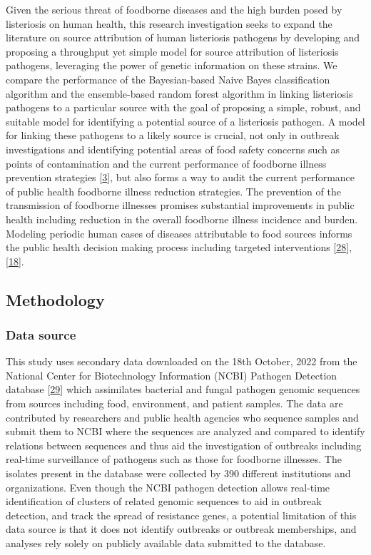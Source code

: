 \documentclass[
  10pt,
]{article}
\begin{document}
Given the serious threat of foodborne diseases and the high burden posed by listeriosis on human health, this research investigation seeks to expand the literature on source attribution of human listeriosis pathogens by developing and proposing a throughput yet simple model for source attribution of listeriosis pathogens, leveraging the power of genetic information on these strains. We compare the performance of the Bayesian-based Naive Bayes classification algorithm and the ensemble-based random forest algorithm in linking listeriosis pathogens to a particular source with the goal of proposing a simple, robust, and suitable model for identifying a potential source of a listeriosis pathogen. A model for linking these pathogens to a likely source is crucial, not only in outbreak investigations and identifying potential areas of food safety concerns such as points of contamination and the current performance of foodborne illness prevention strategies {[}\protect\hyperlink{ref-tanui2022machine}{3}{]}, but also forms a way to audit the current performance of public health foodborne illness reduction strategies. The prevention of the transmission of foodborne illnesses promises substantial improvements in public health including reduction in the overall foodborne illness incidence and burden. Modeling periodic human cases of diseases attributable to food sources informs the public health decision making process including targeted interventions {[}\protect\hyperlink{ref-pires2014source}{28}{]}, {[}\protect\hyperlink{ref-Munck2020}{18}{]}.

\hypertarget{methodology}{%
\subsection{Methodology}\label{methodology}}

\hypertarget{data-source}{%
\subsubsection{Data source}\label{data-source}}

This study uses secondary data downloaded on the 18th October, 2022 from the National Center for Biotechnology Information (NCBI) Pathogen Detection database {[}\protect\hyperlink{ref-ncbi2016}{29}{]} which assimilates bacterial and fungal pathogen genomic sequences from sources including food, environment, and patient samples. The data are contributed by researchers and public health agencies who sequence samples and submit them to NCBI where the sequences are analyzed and compared to identify relations between sequences and thus aid the investigation of outbreaks including real-time surveillance of pathogens such as those for foodborne illnesses. The isolates present in the database were collected by 390 different institutions and organizations. Even though the NCBI pathogen detection allows real-time identification of clusters of related genomic sequences to aid in outbreak detection, and track the spread of resistance genes, a potential limitation of this data source is that it does not identify outbreaks or outbreak memberships, and analyses rely solely on publicly available data submitted to the database.
\end{document}
